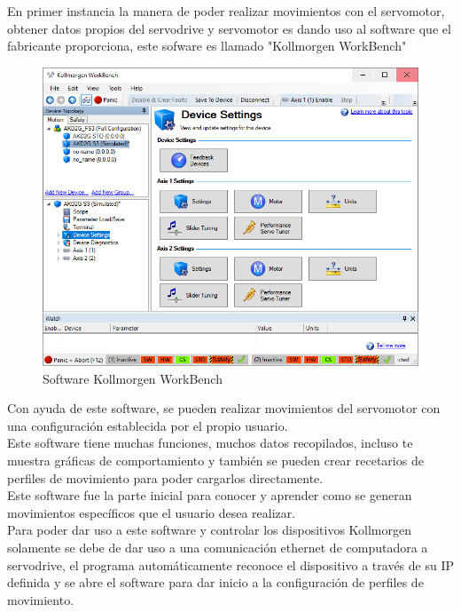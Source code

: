 \documentclass[12pt,titlepage]{article}
\begin{document}
En primer instancia la manera de poder realizar movimientos con el servomotor, obtener datos propios del servodrive y servomotor es dando uso al software que el fabricante proporciona, este sofware es llamado "Kollmorgen WorkBench" \\ 

\begin{figure}[htbp]
\hspace*{2.5cm} 
\includegraphics[scale=0.55]{WorkBench_0}
\caption{Software  Kollmorgen WorkBench}
\end{figure}

Con ayuda de este software, se pueden realizar movimientos del servomotor con una configuración establecida por el propio usuario.\\

Este software tiene muchas funciones, muchos datos recopilados, incluso te muestra gráficas de comportamiento y también se pueden crear recetarios de perfiles de movimiento para poder cargarlos directamente. \\ 

Este software fue la parte inicial para conocer y aprender como se generan movimientos específicos que el usuario desea realizar. \\ 

Para poder dar uso a este software y controlar los dispositivos Kollmorgen solamente se debe de dar uso a una comunicación ethernet de computadora a servodrive, el programa automáticamente reconoce el dispositivo a través de su IP definida y se abre el software para dar inicio a la configuración de perfiles de movimiento. \\ 
\end{document}
